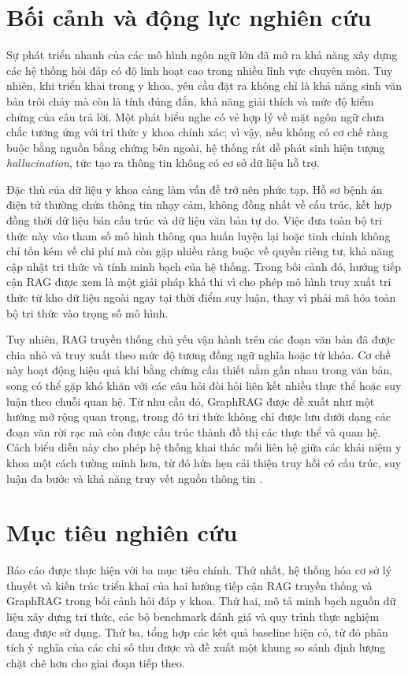 \documentclass[a4paper,12pt,twoside]{report}
\begin{document}
\section{Bối cảnh và động lực nghiên cứu}
Sự phát triển nhanh của các mô hình ngôn ngữ lớn đã mở ra khả năng xây dựng các hệ thống hỏi đáp có độ linh hoạt cao trong nhiều lĩnh vực chuyên môn. Tuy nhiên, khi triển khai trong y khoa, yêu cầu đặt ra không chỉ là khả năng sinh văn bản trôi chảy mà còn là tính đúng đắn, khả năng giải thích và mức độ kiểm chứng của câu trả lời. Một phát biểu nghe có vẻ hợp lý về mặt ngôn ngữ chưa chắc tương ứng với tri thức y khoa chính xác; vì vậy, nếu không có cơ chế ràng buộc bằng nguồn bằng chứng bên ngoài, hệ thống rất dễ phát sinh hiện tượng \textit{hallucination}, tức tạo ra thông tin không có cơ sở dữ liệu hỗ trợ.

Đặc thù của dữ liệu y khoa càng làm vấn đề trở nên phức tạp. Hồ sơ bệnh án điện tử thường chứa thông tin nhạy cảm, không đồng nhất về cấu trúc, kết hợp đồng thời dữ liệu bán cấu trúc và dữ liệu văn bản tự do. Việc đưa toàn bộ tri thức này vào tham số mô hình thông qua huấn luyện lại hoặc tinh chỉnh không chỉ tốn kém về chi phí mà còn gặp nhiều ràng buộc về quyền riêng tư, khả năng cập nhật tri thức và tính minh bạch của hệ thống. Trong bối cảnh đó, hướng tiếp cận RAG được xem là một giải pháp khả thi vì cho phép mô hình truy xuất tri thức từ kho dữ liệu ngoài ngay tại thời điểm suy luận, thay vì phải mã hóa toàn bộ tri thức vào trọng số mô hình.

Tuy nhiên, RAG truyền thống chủ yếu vận hành trên các đoạn văn bản đã được chia nhỏ và truy xuất theo mức độ tương đồng ngữ nghĩa hoặc từ khóa. Cơ chế này hoạt động hiệu quả khi bằng chứng cần thiết nằm gần nhau trong văn bản, song có thể gặp khó khăn với các câu hỏi đòi hỏi liên kết nhiều thực thể hoặc suy luận theo chuỗi quan hệ. Từ nhu cầu đó, GraphRAG được đề xuất như một hướng mở rộng quan trọng, trong đó tri thức không chỉ được lưu dưới dạng các đoạn văn rời rạc mà còn được cấu trúc thành đồ thị các thực thể và quan hệ. Cách biểu diễn này cho phép hệ thống khai thác mối liên hệ giữa các khái niệm y khoa một cách tường minh hơn, từ đó hứa hẹn cải thiện truy hồi có cấu trúc, suy luận đa bước và khả năng truy vết nguồn thông tin \cite{edge2024,wu2024}.

\section{Mục tiêu nghiên cứu}
Báo cáo được thực hiện với ba mục tiêu chính. Thứ nhất, hệ thống hóa cơ sở lý thuyết và kiến trúc triển khai của hai hướng tiếp cận RAG truyền thống và GraphRAG trong bối cảnh hỏi đáp y khoa. Thứ hai, mô tả minh bạch nguồn dữ liệu xây dựng tri thức, các bộ benchmark đánh giá và quy trình thực nghiệm đang được sử dụng. Thứ ba, tổng hợp các kết quả baseline hiện có, từ đó phân tích ý nghĩa của các chỉ số thu được và đề xuất một khung so sánh định lượng chặt chẽ hơn cho giai đoạn tiếp theo.
\end{document}

